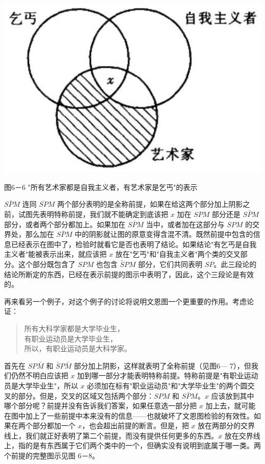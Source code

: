 \begin{center}
\includegraphics[width=\textwidth]{images/2025_05_15_6a28331d5e7c993ad07ag-277.jpg}

图6－6 "所有艺术家都是自我主义者，有艺术家是乞丐"的表示
\end{center}

$S\bar{P}M$ 连同 $\overline{SP}M$ 两个部分表明的是全称前提，如果在给这两个部分加上阴影之前，试图先表明特称前提，我们就不能确定到底该把 $x$ 加在 $SPM$ 部分还是 $S\bar{P}M$ 部分，或者两个部分都加上。如果加在 $S\bar{P}M$ 当中，或者加在这部分与 $SPM$ 的交界处，那么加在 $S\bar{P}M$ 中的阴影就让图的原意变得含混不清。既然前提中包含的信息已经表示在图中了，检验时就看它是否也表明了结论。如果结论"有乞丐是自我主义者"能被表示出来，就应该把 $x$ 放在"乞丐"和"自我主义者"两个类的交叉部分。这个部分既包含了 $SPM$ 也包含 $\bar{S}PM$ 部分，它们共同表明 $SP$。此三段论的结论所断定的东西，已经在表示前提的图示中表明了，因此，这个三段论是有效的。

再来看另一个例子，对这个例子的讨论将说明文恩图一个更重要的作用。考虑论证：

\begin{quote}
所有大科学家都是大学毕业生，\\
有职业运动员是大学毕业生，\\
所以，有职业运动员是大科学家。
\end{quote}

首先在 $SP\bar{M}$ 和 $\bar{S}P\bar{M}$ 部分加上阴影，这样就表明了全称前提（见图6— 7），但我们仍然不明白应该把 $x$ 加到哪一部分才能表明特称前提。特称前提是"有职业运动员是大学毕业生"，所以 $x$ 必须加在标有"职业运动员"和"大学毕业生"的两个圆交叉的部分。但是，交叉的区域又包括两个部分：$SPM$ 和 $S\bar{P}M$。$x$ 应该放到其中哪个部分呢？前提并没有告诉我们答案，如果任意选一部分把 $x$ 加上去，就可能在图中加上了一些前提中本来没有的信息——也就破坏了文恩图检验的有效性。如果在两个部分都加一个 $x$，也会超出前提的断言。但是，把 $x$ 放在两部分的交界线上，我们就正好表明了第二个前提，而没有提供任何更多的东西。$x$ 放在交界线上，指的是有东西属于它们两个类中的一个，但确实没有说明到底属于哪一类。两个前提的完整图示见图 6－8。

